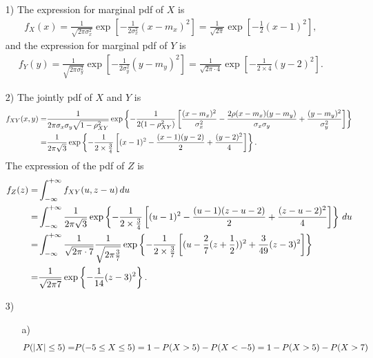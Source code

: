 \documentclass{assignment}
\begin{document}
\begin{sol}
    \begin{itemize}
        \item[1)] The expression for marginal pdf of $X$ is
        \begin{align}
            f_X(x)=\frac{1}{\sqrt{2\pi\sigma_x^2}}\exp\left[-\frac{1}{2\sigma_x^2}(x-m_x)^2\right]=\frac{1}{\sqrt{2\pi}}\exp\left[-\frac{1}{2}(x-1)^2\right],
        \end{align}
        and the expression for marginal pdf of $Y$ is
        \begin{align}
            f_Y(y)=\frac{1}{\sqrt{2\pi\sigma_y^2}}\exp\left[-\frac{1}{2\sigma_y^2}(y-m_y)^2\right]=\frac{1}{\sqrt{2\pi\cdot 4}}\exp\left[-\frac{1}{2\times 4}(y-2)^2\right].
        \end{align}
        \item[2)] The jointly pdf of $X$ and $Y$ is
        \begin{align}
            \notag f_{XY}(x,y)=&\frac{1}{2\pi\sigma_x\sigma_y\sqrt{1-\rho_{XY}^2}}\exp\left\{-\frac{1}{2(1-\rho_{XY}^2)}\left[\frac{(x-m_x)^2}{\sigma_x^2}-\frac{2\rho(x-m_x)(y-m_y)}{\sigma_x\sigma_y}+\frac{(y-m_y)^2}{\sigma_y^2}\right]\right\}\\
            =&\frac{1}{2\pi\sqrt{3}}\exp\left\{-\frac{1}{2\times\frac{3}{4}}\left[(x-1)^2-\frac{(x-1)(y-2)}{2}+\frac{(y-2)^2}{4}\right]\right\}.
        \end{align}
        The expression of the pdf of $Z$ is
        \begin{align}
            \notag f_Z(z)=&\int_{-\infty}^{+\infty}f_{XY}(u,z-u)\,du\\
            \notag=&\int_{-\infty}^{+\infty}\frac{1}{2\pi\sqrt{3}}\exp\left\{-\frac{1}{2\times\frac{3}{4}}\left[(u-1)^2-\frac{(u-1)(z-u-2)}{2}+\frac{(z-u-2)^2}{4}\right]\right\}\,du\\
            \notag=&\int_{-\infty}^{+\infty}\frac{1}{\sqrt{2\pi\cdot 7}}\frac{1}{\sqrt{2\pi\frac{3}{7}}}\exp\left\{-\frac{1}{2\times\frac{3}{7}}\left[(u-\frac{2}{7}(z+\frac{1}{2}))^2+\frac{3}{49}(z-3)^2\right]\right\}\\
            =&\frac{1}{\sqrt{2\pi 7}}\exp\left\{-\frac{1}{14}(z-3)^2\right\}.
        \end{align}
        \item[3)] 
        \begin{itemize}
            \item[a)] 
            \begin{align}
                \notag P(\abs{X}\leq 5)=&P(-5\leq X\leq 5)=1-P(X>5)-P(X<-5)=1-P(X>5)-P(X>7)\\

\end{align}
\end{itemize}
\end{itemize}
\end{sol}
\end{document}
